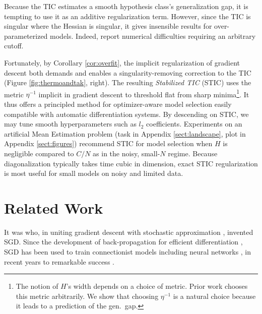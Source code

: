 \documentclass{article}
\theoremstyle{plain}
\theoremstyle{definition}
\begin{document}
        Because the TIC estimates a smooth hypothesis class's generalization
        gap, it is tempting to use it as an additive regularization term.
        However, since the TIC is singular where the Hessian is singular, it
        gives insensible results for over-parameterized models.  Indeed,
        \citet{di18} report numerical difficulties requiring an arbitrary
        cutoff. 

        Fortunately, by Corollary \ref{cor:overfit}, the implicit
        regularization of gradient descent both demands and enables a
        singularity-removing correction to the TIC (Figure
        \ref{fig:thermoandtak}, right).  
        The resulting \emph{Stabilized TIC} (STIC) uses the metric $\eta^{-1}$
        implicit in gradient descent to threshold flat from sharp
        minima\footnote{
            The notion of $H$'s width depends on a choice of
            metric.  Prior work chooses this metric arbitrarily.  We show that
            choosing $\eta^{-1}$ is a natural choice because it leads to a
            prediction of the gen.\ gap.
        }.
        It thus offers a principled method for
        optimizer-aware model selection easily compatible with automatic
        differentiation systems.  By descending on STIC, we may tune smooth
        hyperparameters such as $l_2$ coefficients.  Experiments on an
        artificial Mean Estimation problem (task in Appendix
        \ref{sect:landscape}, plot in Appendix \ref{sect:figures}) recommend
        STIC for model selection when $H$ is negligible compared to $C/N$ as in
        the noisy, small-$N$ regime.  Because diagonalization typically takes
        time cubic in dimension, exact STIC regularization is most useful for
        small models on noisy and limited data.


\section{Related Work} \label{sect:related}


    It was \citet{ki52} who, in uniting gradient descent \citep{ca47} with
    stochastic approximation \citep{ro51}, invented SGD.  Since the development
    of back-propagation for efficient differentiation \citep{we74}, SGD has
    been used to train connectionist models including neural networks
    \citep{bo91}, in recent years to remarkable success \citep{le15}.
\end{document}
